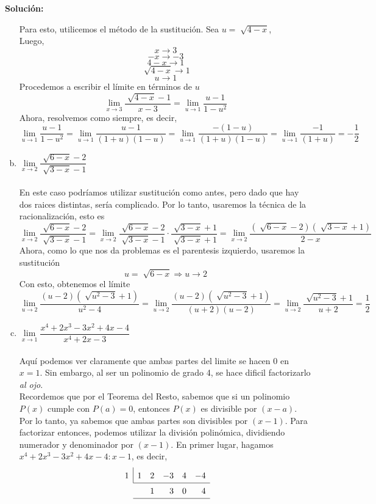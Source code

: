 \documentclass[12pt]{article}
\newenvironment{solucion}
{\begin{mdframed}[backgroundcolor=black!10]
		{\bf Solución:}\\
	}
	{
	\end{mdframed}
}
\newenvironment{preguntas}
{\begin{enumerate}\itemsep12pt
	}
	{
	\end{enumerate}
}
\newcommand{\ra}{\rightarrow}
\begin{document}
\begin{preguntas}
\begin{solucion}
\begin{enumerate}[a)]
Para esto, utilicemos el método de la sustitución. Sea $u = \sqrt[]{4-x}$,\\
Luego,
$$x \ra 3$$
$$-x \ra -3$$
$$4-x \ra 1$$
$$\sqrt[]{4-x} \ra 1$$
$$u \ra 1$$
Procedemos a escribir el límite en términos de $u$
$$\lim\limits_{x \ra 3} \dfrac{\sqrt[]{4-x}-1}{x-3}
= \lim\limits_{u \ra 1} \dfrac{u-1}{1-u^2} $$
Ahora, resolvemos como siempre, es decir,
$$\lim\limits_{u \ra 1} \dfrac{u-1}{1-u^2} 
= \lim\limits_{u \ra 1} \dfrac{u-1}{(1+u)(1-u)}
= \lim\limits_{u \ra 1} \dfrac{-(1-u)}{(1+u)(1-u)}
= \lim\limits_{u \ra 1} \dfrac{-1}{(1+u)}
= -\dfrac{1}{2}$$
\item $\lim\limits_{x \ra 2} \dfrac{\sqrt[]{6-x}-2}{\sqrt[]{3-x}-1}$\\
\\
En este caso podríamos utilizar sustitución como antes, pero dado que hay dos raices distintas, sería complicado. Por lo tanto, usaremos la técnica de la racionalización, esto es
$$\lim\limits_{x \ra 2} \dfrac{\sqrt[]{6-x}-2}{\sqrt[]{3-x}-1}
=\lim\limits_{x \ra 2} \dfrac{\sqrt[]{6-x}-2}{\sqrt[]{3-x}-1} \cdot \dfrac{\sqrt[]{3-x}+1}{\sqrt[]{3-x}+1} 
=\lim\limits_{x \ra 2} \dfrac{(\sqrt[]{6-x}-2)(\sqrt[]{3-x}+1)}{2-x} $$
Ahora, como lo que nos da problemas es el parentesis izquierdo, usaremos la sustitución
$$u = \sqrt[]{6-x} \Longrightarrow u \ra 2$$
Con esto, obtenemos el límite
$$\lim\limits_{u \ra 2} \dfrac{(u-2)(\sqrt[]{u^2-3}+1)}{u^2-4} 
=\lim\limits_{u \ra 2} \dfrac{(u-2)(\sqrt[]{u^2-3}+1)}{(u+2)(u-2)} 
=\lim\limits_{u \ra 2} \dfrac{\sqrt[]{u^2-3}+1}{u+2}
=\dfrac{1}{2}$$
\item $\lim\limits_{x \ra 1} \dfrac{x^4+2x^3-3x^2+4x-4}{x^4+2x-3}$\\
\\
Aquí podemos ver claramente que ambas partes del limite se hacen 0 en $x=1$. Sin embargo, al ser un polinomio de grado 4, se hace dificil factorizarlo \textit{al ojo}.\\
Recordemos que por el Teorema del Resto, sabemos que si un polinomio $P(x)$ cumple con $P(a) = 0$, entonces $P(x)$ es divisible por $(x-a)$. Por lo tanto, ya sabemos que ambas partes son divisibles por $(x-1)$. Para factorizar entonces, podemos utilizar la división polinómica, dividiendo numerador y denominador por $(x-1)$.
En primer lugar, hagamos $x^4+2x^3-3x^2+4x-4 : x-1$, es decir,
\[
\renewcommand\arraystretch{1.5}
\setlength\doublerulesep{0pt}
\begin{array}{rrrrrr}
\multicolumn{1}{r|}{1} & 1 & 2 & -3 & 4 & -4\\\cline{2-6}
& & 1& 3 & 0 & 4\\\cline{2-6}

\end{array}\]
\end{enumerate}
\end{solucion}
\end{preguntas}
\end{document}

